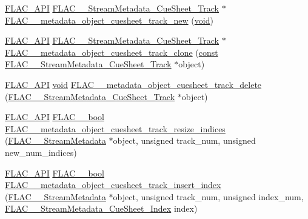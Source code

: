 \begin{DoxyCompactItemize}
\hyperlink{group__flac__export_ga56ca07df8a23310707732b1c0007d6f5}{F\+L\+A\+C\+\_\+\+A\+PI} \hyperlink{struct_f_l_a_c_____stream_metadata___cue_sheet___track}{F\+L\+A\+C\+\_\+\+\_\+\+Stream\+Metadata\+\_\+\+Cue\+Sheet\+\_\+\+Track} $\ast$ \hyperlink{group__flac__metadata__object_ga9bc27c6ed075c29d12027079e00d9997}{F\+L\+A\+C\+\_\+\+\_\+metadata\+\_\+object\+\_\+cuesheet\+\_\+track\+\_\+new} (\hyperlink{sound_8c_ae35f5844602719cf66324f4de2a658b3}{void})
\item 
\hyperlink{group__flac__export_ga56ca07df8a23310707732b1c0007d6f5}{F\+L\+A\+C\+\_\+\+A\+PI} \hyperlink{struct_f_l_a_c_____stream_metadata___cue_sheet___track}{F\+L\+A\+C\+\_\+\+\_\+\+Stream\+Metadata\+\_\+\+Cue\+Sheet\+\_\+\+Track} $\ast$ \hyperlink{group__flac__metadata__object_gaf085bed12af15034839307ca04286d4f}{F\+L\+A\+C\+\_\+\+\_\+metadata\+\_\+object\+\_\+cuesheet\+\_\+track\+\_\+clone} (\hyperlink{getopt1_8c_a2c212835823e3c54a8ab6d95c652660e}{const} \hyperlink{struct_f_l_a_c_____stream_metadata___cue_sheet___track}{F\+L\+A\+C\+\_\+\+\_\+\+Stream\+Metadata\+\_\+\+Cue\+Sheet\+\_\+\+Track} $\ast$object)
\item 
\hyperlink{group__flac__export_ga56ca07df8a23310707732b1c0007d6f5}{F\+L\+A\+C\+\_\+\+A\+PI} \hyperlink{sound_8c_ae35f5844602719cf66324f4de2a658b3}{void} \hyperlink{group__flac__metadata__object_ga8fbf8912add405a4b1acd510b6e27c89}{F\+L\+A\+C\+\_\+\+\_\+metadata\+\_\+object\+\_\+cuesheet\+\_\+track\+\_\+delete} (\hyperlink{struct_f_l_a_c_____stream_metadata___cue_sheet___track}{F\+L\+A\+C\+\_\+\+\_\+\+Stream\+Metadata\+\_\+\+Cue\+Sheet\+\_\+\+Track} $\ast$object)
\item 
\hyperlink{group__flac__export_ga56ca07df8a23310707732b1c0007d6f5}{F\+L\+A\+C\+\_\+\+A\+PI} \hyperlink{ordinals_8h_a95103469f1cbd78b8cf250194985b34e}{F\+L\+A\+C\+\_\+\+\_\+bool} \hyperlink{group__flac__metadata__object_ga57dfba89ba704574bde4e3fcd925d473}{F\+L\+A\+C\+\_\+\+\_\+metadata\+\_\+object\+\_\+cuesheet\+\_\+track\+\_\+resize\+\_\+indices} (\hyperlink{struct_f_l_a_c_____stream_metadata}{F\+L\+A\+C\+\_\+\+\_\+\+Stream\+Metadata} $\ast$object, unsigned track\+\_\+num, unsigned new\+\_\+num\+\_\+indices)
\item 
\hyperlink{group__flac__export_ga56ca07df8a23310707732b1c0007d6f5}{F\+L\+A\+C\+\_\+\+A\+PI} \hyperlink{ordinals_8h_a95103469f1cbd78b8cf250194985b34e}{F\+L\+A\+C\+\_\+\+\_\+bool} \hyperlink{group__flac__metadata__object_ga2f8c5d80c409eff5ebd53ccd0c6f0984}{F\+L\+A\+C\+\_\+\+\_\+metadata\+\_\+object\+\_\+cuesheet\+\_\+track\+\_\+insert\+\_\+index} (\hyperlink{struct_f_l_a_c_____stream_metadata}{F\+L\+A\+C\+\_\+\+\_\+\+Stream\+Metadata} $\ast$object, unsigned track\+\_\+num, unsigned index\+\_\+num, \hyperlink{struct_f_l_a_c_____stream_metadata___cue_sheet___index}{F\+L\+A\+C\+\_\+\+\_\+\+Stream\+Metadata\+\_\+\+Cue\+Sheet\+\_\+\+Index} index)

\end{DoxyCompactItemize}
